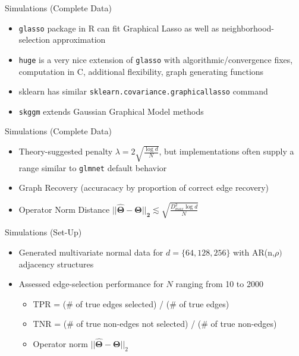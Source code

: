 \documentclass{beamer}
\begin{document}
\begin{frame}{Simulations (Complete Data)}
    \begin{itemize}
        \item \texttt{glasso} package in R can fit Graphical Lasso as well as neighborhood-selection approximation 
        \item \texttt{huge} is a very nice extension of \texttt{glasso} with algorithmic/convergence fixes, computation in C, additional flexibility, graph generating functions 
        \item sklearn has similar \texttt{sklearn.covariance.graphicallasso} command 
        \item \texttt{skggm} extends Gaussian Graphical Model methods  %
    \end{itemize}
\end{frame}

\begin{frame}{Simulations (Complete Data)}
    \begin{itemize}\setlength\itemsep{6mm}
        \item Theory-suggested penalty $\lambda = 2\sqrt{\frac{\log d}{N}}$, but implementations often supply a range similar to \texttt{glmnet} default behavior
        \item Graph Recovery (accuracacy by proportion of correct edge recovery)
        \item Operator Norm Distance $\mathbf{||\hat\Theta - \Theta||_2} \lesssim \sqrt{\frac{D_{max}^2\log d}{N}}$ 
    \end{itemize}
\end{frame}

\begin{frame}{Simulations (Set-Up)}
    \begin{itemize}\setlength\itemsep{8mm}
        \item Generated multivariate normal data for $d=\{64, 128, 256\}$ with AR(n,$\rho)$ adjacency structures
        \item Assessed edge-selection performance for $N$ ranging from 10 to 2000 
            \begin{itemize}
                \item TPR = (\# of true edges selected) / (\# of true edges)
                \item TNR = (\# of true non-edges not selected) / (\# of true non-edges)
                \item Operator norm $||\mathbf{\hat\Theta - \Theta}||_2$
            \end{itemize}
    \end{itemize}
\end{frame}
\end{document}
